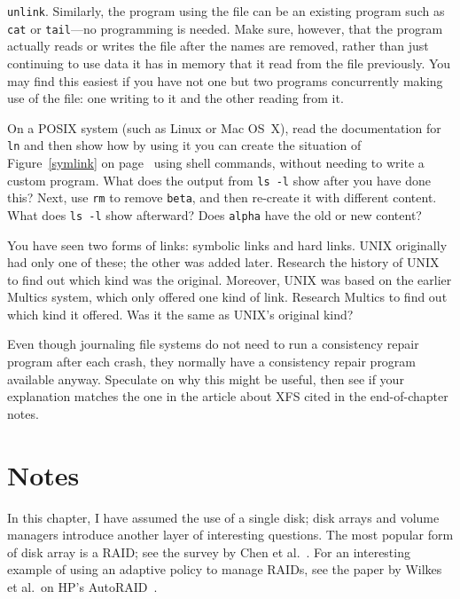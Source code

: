 \begin{chapterEnumerate}
\verb|unlink|.  Similarly, the program using the file can be an
existing program such as \verb|cat| or \verb|tail|---no programming is needed.  Make sure, however, that
the program actually reads or writes the file after the names are
removed, rather than just continuing to use data it has in memory that
it read from the file previously.  You may find this easiest if you
have not one but two programs concurrently making use of the file: one
writing to it and the other reading from it.
\item\label{ln-s-project}
On a POSIX system (such as Linux or Mac OS~X), read the documentation
for \verb|ln| and then show how by using it you can create the situation
of Figure~\ref{symlink} on page~\pageref{symlink} using shell commands, without needing to
write a custom program.  What does the output from \verb|ls -l| show
after you have done this?  Next, use \verb|rm| to remove \verb|beta|,
and then re-create it with different content.  What does \verb|ls -l|
show afterward?  Does \verb|alpha| have the old or new content?
\item
You have seen two forms of links: symbolic links and hard links.
UNIX originally had only one of these; the other was added
later.  Research the history of UNIX to find out which kind was the
original.  Moreover, UNIX was based on the earlier Multics system,
which only offered one kind of link.  Research Multics to find out
which kind it offered.  Was it the same as UNIX's original
kind?
\item
Even though journaling file systems do not need to run a consistency
repair program after each crash, they normally have a consistency
repair program available anyway.  Speculate on why this might be
useful, then see if your explanation matches the one in the article
about XFS cited in the end-of-chapter notes.
\end{chapterEnumerate}

\section*{Notes}
In this chapter, I have assumed the use of a single disk; disk arrays and volume
managers introduce another layer of interesting questions.  The most
popular form of disk array is a RAID; see the survey by Chen et
al.~\cite{max1137}.  For an interesting example of using an adaptive
policy to manage RAIDs, see the paper by Wilkes et al.\ on HP's
AutoRAID~\cite{max820}.

